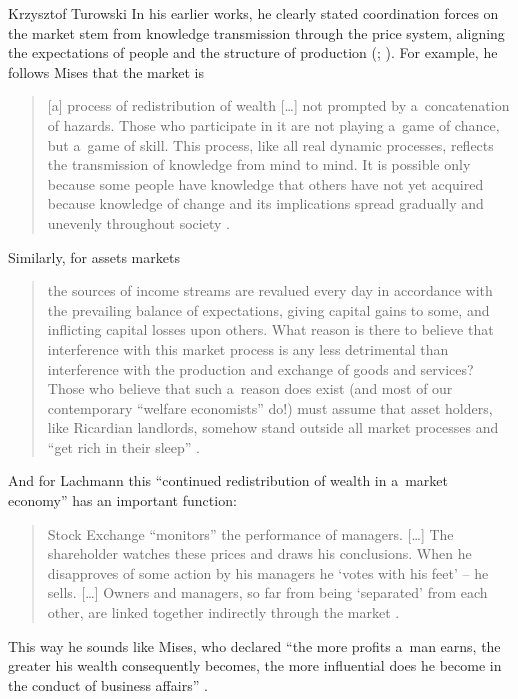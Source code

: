 \begin{artengenv}{Krzysztof Turowski}
In his earlier works, he clearly stated coordination forces on the market stem from knowledge
transmission through the price system, aligning the expectations of people and the structure of production (\cite[103]{lachmann-ha}; \citeyear[62]{lachmann1956capital}).
For example, he follows Mises that the market is
\begin{quote}
[a] process of redistribution of wealth [\ldots] not prompted by a~concatenation of hazards. Those who participate in it are not playing a~game of chance, but a~game of skill. This process, like all real dynamic processes, reflects the transmission of knowledge from mind to mind. It is possible only because some people have knowledge that others have not yet acquired because knowledge of change and its implications spread gradually and unevenly throughout society \parencite[313]{lachmann-market-distribution}.
\end{quote}
Similarly, for assets markets
\begin{quote}
the sources of income streams are revalued every day in accordance with the prevailing balance of expectations, giving capital gains to some, and inflicting capital losses upon others. What reason is there to believe that interference with this market process is any less detrimental than interference with the production and exchange of goods and services? Those who believe that such a~reason does exist (and most of our contemporary ``welfare economists'' do!) must assume that asset holders, like Ricardian landlords, somehow stand outside all market processes and ``get rich in their sleep'' \parencite[163]{lachmann-model}.
\end{quote}
And for Lachmann this ``continued redistribution of wealth in a~market economy'' \parencite[202]{lachmann-hayek} has an important function:
\begin{quote}
Stock Exchange ``monitors'' the performance of managers. [\ldots] The shareholder watches these prices and draws his conclusions. When he disapproves of some action by his managers he `votes with his feet' -- he sells. [\ldots] Owners and managers, so far from being `separated' from each other, are linked together indirectly through the market \parencite[249]{lachmann-legislation}.
\end{quote}
This way he sounds like Mises, who declared ``the more profits a~man earns, the greater his wealth consequently becomes, the more influential does he become in the conduct of business affairs'' \parencite[23]{mises-profit}.


\end{artengenv}
